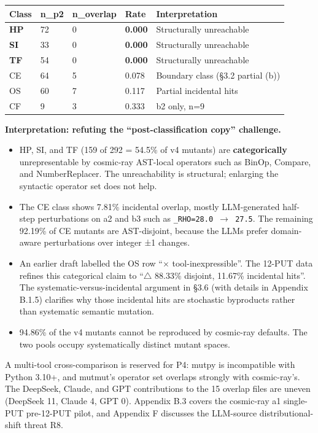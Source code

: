\documentclass[review,12pt,authoryear]{elsarticle}
\providecommand{\tightlist}{\setlength{\itemsep}{0pt}\setlength{\parskip}{0pt}}
\newcounter{none}                   %
\begin{document}
{\def\LTcaptype{none} %
\begin{longtable}[]{@{}lllll@{}}
\toprule\noalign{}
Class & n\_p2 & n\_overlap & Rate & Interpretation \\
\midrule\noalign{}
\endhead
\bottomrule\noalign{}
\endlastfoot
\textbf{HP} & 72 & 0 & \textbf{0.000} & Structurally unreachable \\
\textbf{SI} & 33 & 0 & \textbf{0.000} & Structurally unreachable \\
\textbf{TF} & 54 & 0 & \textbf{0.000} & Structurally unreachable \\
CE & 64 & 5 & 0.078 & Boundary class (§3.2 partial (b)) \\
OS & 60 & 7 & 0.117 & Partial incidental hits \\
CF & 9 & 3 & 0.333 & b2 only, n=9 \\
\end{longtable}
}

\textbf{Interpretation: refuting the ``post-classification copy''
challenge.}

\begin{itemize}
\tightlist
\item
  HP, SI, and TF (159 of 292 = 54.5\% of v4 mutants) are
  \textbf{categorically} unrepresentable by cosmic-ray AST-local
  operators such as BinOp, Compare, and NumberReplacer. The
  unreachability is structural; enlarging the syntactic operator set
  does not help.
\item
  The CE class shows 7.81\% incidental overlap, mostly LLM-generated
  half-step perturbations on a2 and b3 such as
  \texttt{\_RHO=28.0\ $\to$\ 27.5}. The remaining 92.19\% of CE mutants are
  AST-disjoint, because the LLMs prefer domain-aware perturbations over
  integer ±1 changes.
\item
  An earlier draft labelled the OS row ``$\times$ tool-inexpressible''. The
  12-PUT data refines this categorical claim to ``$\bigtriangleup$ 88.33\% disjoint,
  11.67\% incidental hits''. The systematic-versus-incidental argument
  in §3.6 (with details in Appendix B.1.5) clarifies why those
  incidental hits are stochastic byproducts rather than systematic
  semantic mutation.
\item
  94.86\% of the v4 mutants cannot be reproduced by cosmic-ray defaults.
  The two pools occupy systematically distinct mutant spaces.
\end{itemize}

A multi-tool cross-comparison is reserved for P4: mutpy is incompatible
with Python 3.10+, and mutmut's operator set overlaps strongly with
cosmic-ray's. The DeepSeek, Claude, and GPT contributions to the 15
overlap files are uneven (DeepSeek 11, Claude 4, GPT 0). Appendix B.3
covers the cosmic-ray a1 single-PUT pre-12-PUT pilot, and Appendix F
discusses the LLM-source distributional-shift threat R8.
\end{document}
